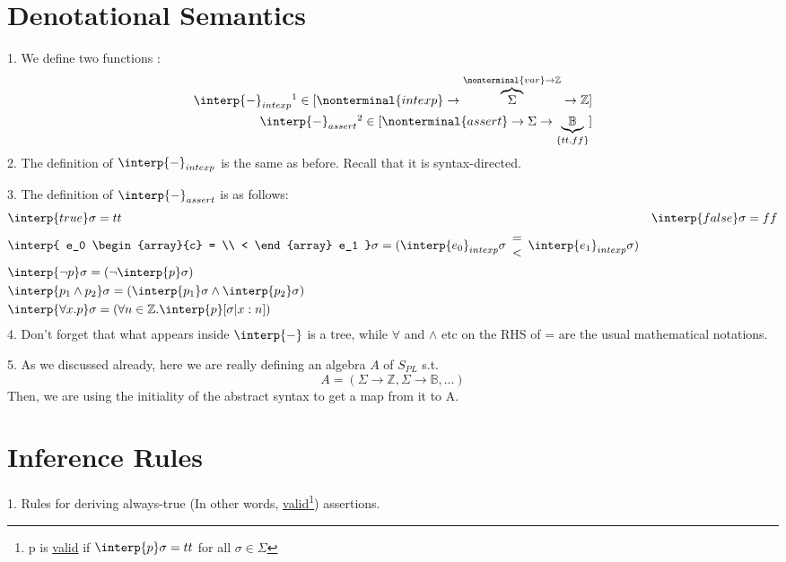 \documentclass{report}[12pt]
\begin{document}
\section{Denotational Semantics}
1. We define two functions :
\begin{align*}
    \interp{ - }_{intexp}\footnotemark \in [\nonterminal{intexp} \rightarrow \overbrace{\Sigma}^{\nonterminal{var}\rightarrow \mathbb{Z}} \rightarrow \mathbb{Z}] \\
    \interp{ - }_{assert}\footnotemark \in [\nonterminal{assert} \rightarrow \Sigma \rightarrow \underbrace{\mathbb{B}}_{\{tt, ff\}}]
\end{align*}
2. The definition of $\interp{ - }_{intexp}$ is the same as before. Recall that it is syntax-directed.

3. The definition of $\interp{ - }_{assert}$ is as follows:
\begin{align*}
    &\interp{ true } \sigma = tt &\interp{ false } \sigma = ff \\
    &\interp{ e_0 \begin{array}{c} = \\ < \end{array} e_1 } \sigma = (\interp{ e_0 }_{intexp} \sigma \begin{array}{c} = \\ < \end{array} \interp{ e_1 }_{intexp} \sigma) \\
    &\interp{ \neg p } \sigma = (\neg \interp{ p } \sigma) \\
    &\interp{ p_1 \wedge p_2 } \sigma = (\interp{ p_1 } \sigma \wedge \interp{ p_2 } \sigma) \\
    &\interp{ \forall x. p } \sigma = (\forall n \in \mathbb{Z}. \interp{ p } [\sigma|x:n])
\end{align*}
4. Don't forget that what appears inside $\interp{ - }$ is a tree, while $\forall$ and $\wedge$ etc on the RHS of = are the usual mathematical notations.

5. As we discussed already, here we are really defining an algebra $A$ of $S_{PL}$ s.t. \[A=(\Sigma \rightarrow \mathbb{Z}, \Sigma \rightarrow \mathbb{B}, \ldots)\]
Then, we are using the initiality of the abstract syntax to get a map from it to A.
\section{Inference Rules}
1. Rules for deriving always-true (In other words, \underline{valid}\footnote{p is \underline{valid} if $\interp{ p } \sigma = tt$ for all $\sigma \in \Sigma$}) assertions.
\end{document}
